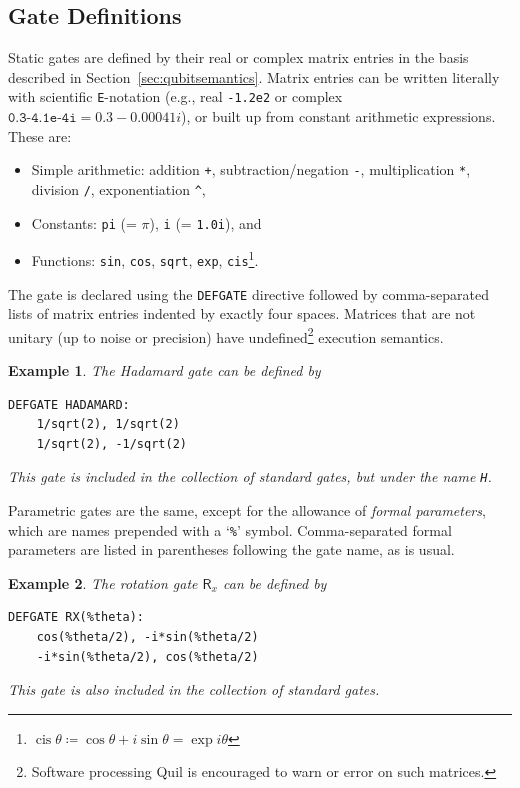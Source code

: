 \documentclass[conference]{IEEEtran}
\newcommand{\RX}{\ensuremath{\mathsf{R}_x}}
\newtheorem{example}{Example}
\begin{document}
\subsection{Gate Definitions}
Static gates are defined by their real or complex matrix entries in the basis described in Section~\ref{sec:qubitsemantics}. Matrix entries can be written literally with scientific \verb|E|-notation  (e.g., real \texttt{-1.2e2} or complex $\texttt{0.3-4.1e-4i}=0.3-0.00041i$), or built up from constant arithmetic expressions. These are:
\begin{itemize}
\item Simple arithmetic: addition \verb|+|, subtraction/negation \verb|-|, multiplication \verb|*|, division \verb|/|, exponentiation \verb|^|,
\item Constants: \verb|pi| (= $\pi$), \verb|i| (= \verb|1.0i|), and
\item Functions: \verb|sin|, \verb|cos|, \verb|sqrt|, \verb|exp|, \verb|cis|\footnote{$\operatorname{cis}\theta \coloneqq \cos\theta + i\sin\theta=\exp{i\theta}$}.
\end{itemize}
The gate is declared using the \verb|DEFGATE| directive followed by comma-separated lists of matrix entries indented by exactly four spaces. Matrices that are not unitary (up to noise or precision) have undefined\footnote{Software processing Quil is encouraged to warn or error on such matrices.} execution semantics.

\begin{example}
The Hadamard gate can be defined by
\begin{verbatim}
DEFGATE HADAMARD:
    1/sqrt(2), 1/sqrt(2)
    1/sqrt(2), -1/sqrt(2)
\end{verbatim}
This gate is included in the collection of standard gates, but under the name \verb|H|.
\end{example}

Parametric gates are the same, except for the allowance of \emph{formal parameters}, which are names prepended with a `\texttt{\%}' symbol. Comma-separated formal parameters are listed in parentheses following the gate name, as is usual.
\begin{example}
The rotation gate $\RX$ can be defined by
\begin{verbatim}
DEFGATE RX(%theta):
    cos(%theta/2), -i*sin(%theta/2)
    -i*sin(%theta/2), cos(%theta/2)
\end{verbatim}
This gate is also included in the collection of standard gates.
\end{example}
\end{document}
